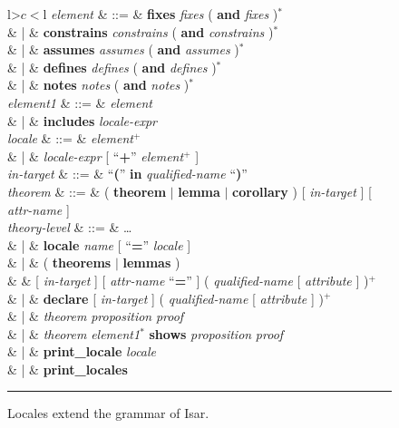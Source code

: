 \begin{isabellebody}
\begin{isamarkuptext}
\begin{figure}
\begin{small}
\begin{tabular}{l>$c<$l}
  \textit{element} & ::=
  & \textbf{fixes} \textit{fixes} ( \textbf{and} \textit{fixes} )$^*$ \\
  & |
  & \textbf{constrains} \textit{constrains}
    ( \textbf{and} \textit{constrains} )$^*$ \\
  & |
  & \textbf{assumes} \textit{assumes} ( \textbf{and} \textit{assumes} )$^*$ \\
  & |
  & \textbf{defines} \textit{defines} ( \textbf{and} \textit{defines} )$^*$ \\
  & |
  & \textbf{notes} \textit{notes} ( \textbf{and} \textit{notes} )$^*$ \\
  \textit{element1} & ::=
  & \textit{element} \\
  & | & \textbf{includes} \textit{locale-expr} \\

  \textit{locale} & ::=
  & \textit{element}$^+$ \\
  & | & \textit{locale-expr} [ ``\textbf{+}'' \textit{element}$^+$ ] \\

  \textit{in-target} & ::=
  & ``\textbf{(}'' \textbf{in} \textit{qualified-name} ``\textbf{)}'' \\

  \textit{theorem} & ::= & ( \textbf{theorem} $|$ \textbf{lemma} $|$
    \textbf{corollary} ) [ \textit{in-target} ] [ \textit{attr-name} ] \\

  \textit{theory-level} & ::= & \ldots \\
  & | & \textbf{locale} \textit{name} [ ``\textbf{=}''
    \textit{locale} ] \\
  & | & ( \textbf{theorems} $|$ \textbf{lemmas} ) \\
  & & [ \textit{in-target} ] [ \textit{attr-name} ``\textbf{=}'' ]
    ( \textit{qualified-name} [ \textit{attribute} ] )$^+$ \\
  & | & \textbf{declare} [ \textit{in-target} ] ( \textit{qualified-name}
    [ \textit{attribute} ] )$^+$ \\
  & | & \textit{theorem} \textit{proposition} \textit{proof} \\
  & | & \textit{theorem} \textit{element1}$^*$
    \textbf{shows} \textit{proposition} \textit{proof} \\
  & | & \textbf{print\_locale} \textit{locale} \\
  & | & \textbf{print\_locales}
  \end{tabular}
  \end{small}
  \vspace{2ex}
  \hrule
  \caption{Locales extend the grammar of Isar.}
  \label{fig-grammar}
  \end{figure}


\end{isamarkuptext}
\end{isabellebody}
